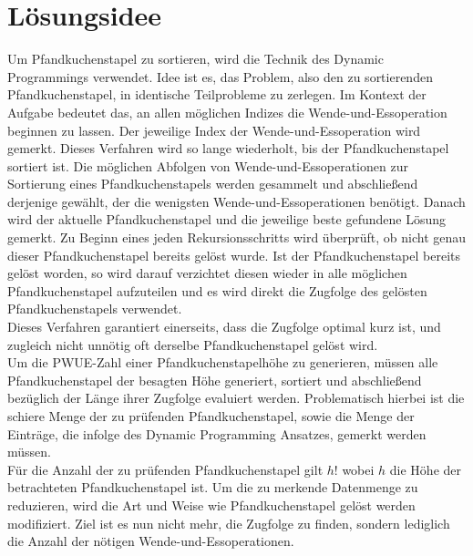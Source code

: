 \maketitle
\tableofcontents

\vspace{0.5cm}


\section{Lösungsidee}\label{sec:losungsidee}
Um Pfandkuchenstapel zu sortieren, wird die Technik des Dynamic Programmings verwendet.
Idee ist es, das Problem, also den zu sortierenden Pfandkuchenstapel, in identische Teilprobleme zu zerlegen.
Im Kontext der Aufgabe bedeutet das, an allen möglichen Indizes die Wende-und-Essoperation beginnen zu lassen.
Der jeweilige Index der Wende-und-Essoperation wird gemerkt.
Dieses Verfahren wird so lange wiederholt, bis der Pfandkuchenstapel sortiert ist.
Die möglichen Abfolgen von Wende-und-Essoperationen zur Sortierung eines Pfandkuchenstapels werden gesammelt
und abschlie{\ss}end derjenige gewählt, der die wenigsten Wende-und-Essoperationen benötigt.
Danach wird der aktuelle Pfandkuchenstapel und die jeweilige beste gefundene Lösung gemerkt.
Zu Beginn eines jeden Rekursionsschritts wird überprüft, ob nicht genau dieser Pfandkuchenstapel bereits gelöst wurde.
Ist der Pfandkuchenstapel bereits gelöst worden, so wird darauf verzichtet diesen wieder in alle möglichen Pfandkuchenstapel
aufzuteilen und es wird direkt die Zugfolge des gelösten Pfandkuchenstapels verwendet. \\
Dieses Verfahren garantiert einerseits, dass die Zugfolge optimal kurz ist, und zugleich nicht unnötig
oft derselbe Pfandkuchenstapel gelöst wird. \\
Um die PWUE-Zahl einer Pfandkuchenstapelhöhe zu generieren, müssen alle Pfandkuchenstapel der besagten Höhe generiert,
sortiert und abschlie{\ss}end bezüglich der Länge ihrer Zugfolge evaluiert werden.
Problematisch hierbei ist die schiere Menge der zu prüfenden Pfandkuchenstapel, sowie die Menge der Einträge, die
infolge des Dynamic Programming Ansatzes, gemerkt werden müssen. \\
Für die Anzahl der zu prüfenden Pfandkuchenstapel gilt $h!$ wobei $h$ die Höhe der betrachteten Pfandkuchenstapel ist.
Um die zu merkende Datenmenge zu reduzieren, wird die Art und Weise wie Pfandkuchenstapel gelöst werden modifiziert.
Ziel ist es nun nicht mehr, die Zugfolge zu finden, sondern lediglich die Anzahl der nötigen Wende-und-Essoperationen.
